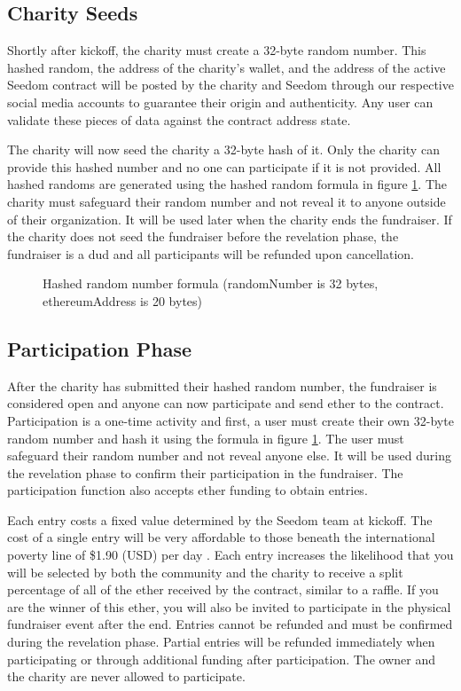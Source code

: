 \documentclass[11pt]{article}
\begin{document}
\subsection{Charity Seeds}
Shortly after kickoff, the charity must create a 32-byte random number. This hashed random, the address of the charity's wallet, and the address of the active Seedom contract will be posted by the charity and Seedom through our respective social media accounts to guarantee their origin and authenticity. Any user can validate these pieces of data against the contract address state.

The charity will now seed the charity a 32-byte hash of it. Only the charity can provide this hashed number and no one can participate if it is not provided. All hashed randoms are generated using the hashed random formula in figure \ref{figure:hashedRandomNumberFormula}. The charity must safeguard their random number and not reveal it to anyone outside of their organization. It will be used later when the charity ends the fundraiser. If the charity does not seed the fundraiser before the revelation phase, the fundraiser is a dud and all participants will be refunded upon cancellation.

\begin{figure}[!htb]
\begin{center}
\caption{Hashed random number formula (randomNumber is 32 bytes, ethereumAddress is 20 bytes)}
\label{figure:hashedRandomNumberFormula}
\end{center}
\end{figure}

\subsection{Participation Phase}

After the charity has submitted their hashed random number, the fundraiser is considered open and anyone can now participate and send ether to the contract. Participation is a one-time activity and first, a user must create their own 32-byte random number and hash it using the formula in figure \ref{figure:hashedRandomNumberFormula}. The user must safeguard their random number and not reveal anyone else. It will be used during the revelation phase to confirm their participation in the fundraiser. The participation function also accepts ether funding to obtain entries.

Each entry costs a fixed value determined by the Seedom team at kickoff. The cost of a single entry will be very affordable to those beneath the international poverty line of \$1.90 (USD) per day \cite{1}. Each entry increases the likelihood that you will be selected by both the community and the charity to receive a split percentage of all of the ether received by the contract, similar to a raffle. If you are the winner of this ether, you will also be invited to participate in the physical fundraiser event after the end. Entries cannot be refunded and must be confirmed during the revelation phase. Partial entries will be refunded immediately when participating or through additional funding after participation. The owner and the charity are never allowed to participate.
\end{document}

